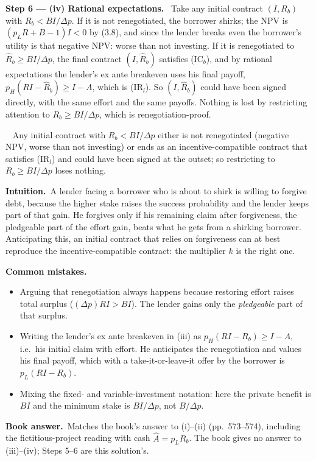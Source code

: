 \documentclass[11pt,a4paper]{article}
\newcommand{\step}[2]{\par\medskip\noindent\textbf{Step #1 --- #2.}~}
\newcommand{\intuition}{\par\medskip\noindent\textbf{Intuition.}~}
\newcommand{\bookans}{\par\medskip\noindent\textbf{Book answer.}~}
\newcommand{\answer}[1]{\par\smallskip\noindent\fbox{\textbf{Answer #1.}}~}
\newcommand{\pitfalls}{\par\medskip\noindent\textbf{Common mistakes.}}
\begin{document}
\step{6}{(iv) Rational expectations} Take any initial contract $(I,R_b)$ with $R_b<BI/\Delta p$. If it is
not renegotiated, the borrower shirks; the NPV is $(p_LR+B-1)I<0$ by (3.8), and since the lender
breaks even the borrower's utility is that negative NPV: worse than not investing. If it is
renegotiated to $\hat R_b\ge BI/\Delta p$, the final contract $(I,\hat R_b)$ satisfies (IC$_b$), and by
rational expectations the lender's ex ante breakeven uses his final payoff,
$p_H(RI-\hat R_b)\ge I-A$, which is (IR$_l$). So $(I,\hat R_b)$ could have been signed directly, with the
same effort and the same payoffs. Nothing is lost by restricting attention to $R_b\ge BI/\Delta p$,
which is renegotiation-proof.

\answer{(iv)} Any initial contract with $R_b<BI/\Delta p$ either is not renegotiated (negative NPV,
worse than not investing) or ends as an incentive-compatible contract that satisfies (IR$_l$) and
could have been signed at the outset; so restricting to $R_b\ge BI/\Delta p$ loses nothing.

\intuition A lender facing a borrower who is about to shirk is willing to forgive debt, because the
higher stake raises the success probability and the lender keeps part of that gain. He forgives only
if his remaining claim after forgiveness, the pledgeable part of the effort gain, beats what he gets
from a shirking borrower. Anticipating this, an initial contract that relies on forgiveness can at
best reproduce the incentive-compatible contract: the multiplier $k$ is the right one.

\pitfalls
\begin{itemize}
  \item Arguing that renegotiation always happens because restoring effort raises total surplus
        ($(\Delta p)RI>BI$). The lender gains only the \emph{pledgeable} part of that surplus.
  \item Writing the lender's ex ante breakeven in (iii) as $p_H(RI-R_b)\ge I-A$, i.e.\ his initial
        claim with effort. He anticipates the renegotiation and values his final payoff, which with a
        take-it-or-leave-it offer by the borrower is $p_L(RI-R_b)$.
  \item Mixing the fixed- and variable-investment notation: here the private benefit is $BI$ and the
        minimum stake is $BI/\Delta p$, not $B/\Delta p$.
\end{itemize}

\bookans Matches the book's answer to (i)--(ii) (pp.~573--574), including the fictitious-project reading
with cash $\hat A=p_LR_b$. The book gives no answer to (iii)--(iv); Steps 5--6 are this solution's.
\end{document}
